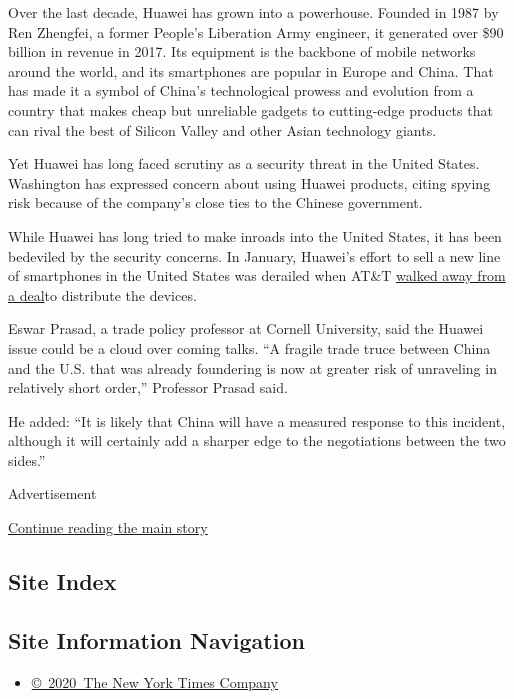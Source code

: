 Over the last decade, Huawei has grown into a powerhouse. Founded in
1987 by Ren Zhengfei, a former People's Liberation Army engineer, it
generated over \$90 billion in revenue in 2017. Its equipment is the
backbone of mobile networks around the world, and its smartphones are
popular in Europe and China. That has made it a symbol of China's
technological prowess and evolution from a country that makes cheap but
unreliable gadgets to cutting-edge products that can rival the best of
Silicon Valley and other Asian technology giants.

Yet Huawei has long faced scrutiny as a security threat in the United
States. Washington has expressed concern about using Huawei products,
citing spying risk because of the company's close ties to the Chinese
government.

While Huawei has long tried to make inroads into the United States, it
has been bedeviled by the security concerns. In January, Huawei's effort
to sell a new line of smartphones in the United States was derailed when
AT\&T
\href{https://www.nytimes.com/2018/01/09/business/att-huawei-mate-smartphone.html?module=inline}{walked
away from a deal}to distribute the devices.

Eswar Prasad, a trade policy professor at Cornell University, said the
Huawei issue could be a cloud over coming talks. ``A fragile trade truce
between China and the U.S. that was already foundering is now at greater
risk of unraveling in relatively short order,'' Professor Prasad said.

He added: ``It is likely that China will have a measured response to
this incident, although it will certainly add a sharper edge to the
negotiations between the two sides.''

Advertisement

\protect\hyperlink{after-bottom}{Continue reading the main story}

\hypertarget{site-index}{%
\subsection{Site Index}\label{site-index}}

\hypertarget{site-information-navigation}{%
\subsection{Site Information
Navigation}\label{site-information-navigation}}

\begin{itemize}
\tightlist
\item
  \href{https://help.nytimes.com/hc/en-us/articles/115014792127-Copyright-notice}{©~2020~The
  New York Times Company}
\end{itemize}


